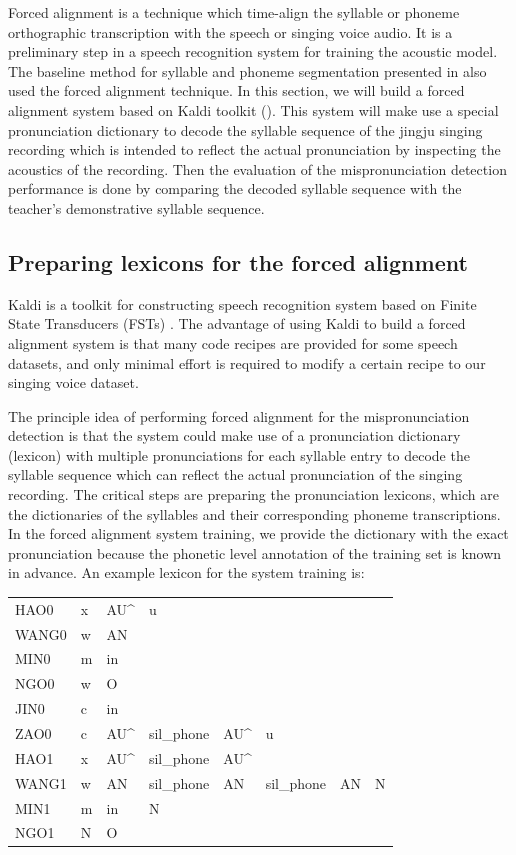Forced alignment is a technique which time-align the syllable or phoneme orthographic transcription with the speech or singing voice audio. It is a preliminary step in a speech recognition system for training the acoustic model. The baseline method for syllable and phoneme segmentation presented in  also used the forced alignment technique. In this section, we will build a forced alignment system based on Kaldi toolkit (). This system will make use a special pronunciation dictionary to decode the syllable sequence of the jingju singing recording which is intended to reflect the actual pronunciation by inspecting the acoustics of the recording. Then the evaluation of the mispronunciation detection performance is done by comparing the decoded syllable sequence with the teacher's demonstrative syllable sequence.

\subsection{Preparing lexicons for the forced alignment}

Kaldi is a toolkit for constructing speech recognition system based on Finite State Transducers (FSTs) \cite{Mohri2002}. The advantage of using Kaldi to build a forced alignment system is that many code recipes are provided for some speech datasets, and only minimal effort is required to modify a certain recipe to our singing voice dataset.

The principle idea of performing forced alignment for the mispronunciation detection is that the system could make use of a pronunciation dictionary (lexicon) with multiple pronunciations for each syllable entry to decode the syllable sequence which can reflect the actual pronunciation of the singing recording. The critical steps are preparing the pronunciation lexicons, which are the dictionaries of the syllables and their corresponding phoneme transcriptions. In the forced alignment system training, we provide the dictionary with the exact pronunciation because the phonetic level annotation of the training set is known in advance. An example lexicon for the system training is:

\begin{table}[ht!]
\begin{tabular}{llllllll}
HAO0 & x & AU\^ & u & & & &  \\
WANG0 & w & AN & & & & & \\
MIN0 & m & in & & & & & \\
NGO0 & w & O & & & & & \\
JIN0 & c & in & & & & & \\
ZAO0 & c & AU\^ & sil\_phone & AU\^ & u & & \\
HAO1 & x & AU\^ & sil\_phone & AU\^ & & & \\
WANG1 & w & AN & sil\_phone & AN & sil\_phone & AN & N \\
MIN1 & m & in & N & & & & \\
NGO1 & N & O & & & & &
\end{tabular}
\end{table}

